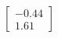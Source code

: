 \documentclass[preview]{standalone}
\begin{document}
\begin{align*}
\begin{bmatrix} -0.44 \\ 1.61 \end{bmatrix}
\end{align*}
\end{document}
